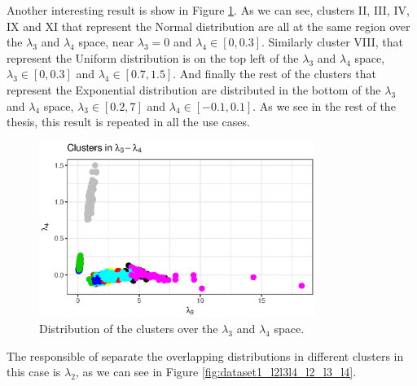 Another interesting result is show in Figure \ref{fig:dataset1_l2l3l4_l3_l4}. As we can see, clusters II, III, IV, IX and XI that represent the Normal distribution are all at the same region over the $\lambda_{3}$ and $\lambda_{4}$ space, near $\lambda_{3} = 0$ and $\lambda_{4} \in [0, 0.3]$. Similarly cluster VIII, that represent the Uniform distribution is on the top left of the $\lambda_{3}$ and $\lambda_{4}$ space, $\lambda_{3} \in [0, 0.3]$ and $\lambda_{4} \in [0.7, 1.5]$. And finally the rest of the clusters that represent the Exponential distribution are distributed in the bottom of the $\lambda_{3}$ and $\lambda_{4}$ space, $\lambda_{3} \in [0.2, 7]$ and $\lambda_{4} \in [-0.1, 0.1]$. As we see in the rest of the thesis, this result is repeated in all the use cases.

\begin{figure}[H]
    \centering
    \includegraphics[width=0.8\textwidth]{img/gld_clustering/datasetI/l2l3l4/l3_l4.eps}
    \caption{Distribution of the clusters over the $\lambda_{3}$ and $\lambda_{4}$ space.}
    \label{fig:dataset1_l2l3l4_l3_l4}
\end{figure}


The responsible of separate the overlapping distributions in different clusters in this case is $\lambda_{2}$, as we can see in Figure \ref{fig:dataset1_l2l3l4_l2_l3_l4}.

